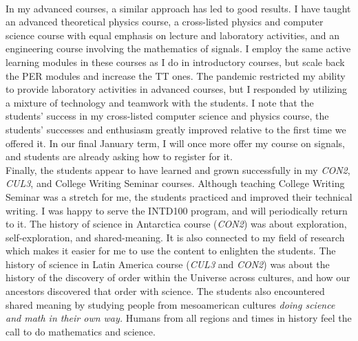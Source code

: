 \documentclass[../../../main.tex]{subfiles}
\begin{document}
\\
\vspace{0.25cm}
In my advanced courses, a similar approach has led to good results.  I have taught an advanced theoretical physics course, a cross-listed physics and computer science course with equal emphasis on lecture and laboratory activities, and an engineering course involving the mathematics of signals.  I employ the same active learning modules in these courses as I do in introductory courses, but scale back the PER modules and increase the TT ones.  The pandemic restricted my ability to provide laboratory activities in advanced courses, but I responded by utilizing a mixture of technology and teamwork with the students.  I note that the students' success in my cross-listed computer science and physics course, the students' successes and enthusiasm greatly improved relative to the first time we offered it.  In our final January term, I will once more offer my course on signals, and students are already asking how to register for it.
\\
\vspace{0.25cm}
Finally, the students appear to have learned and grown successfully in my \textit{CON2}, \textit{CUL3}, and College Writing Seminar courses.  Although teaching College Writing Seminar was a stretch for me, the students practiced and improved their technical writing.  I was happy to serve the INTD100 program, and will periodically return to it.  The history of science in Antarctica course (\textit{CON2}) was about exploration, self-exploration, and shared-meaning.  It is also connected to my field of research which makes it easier for me to use the content to enlighten the students.  The history of science in Latin America course (\textit{CUL3} and \textit{CON2}) was about the history of the discovery of order within the Universe across cultures, and how our ancestors discovered that order with science.  The students also encountered shared meaning by studying people from mesoamerican cultures \textit{doing science and math in their own way.}  Humans from all regions and times in history feel the call to do mathematics and science.
\end{document}
